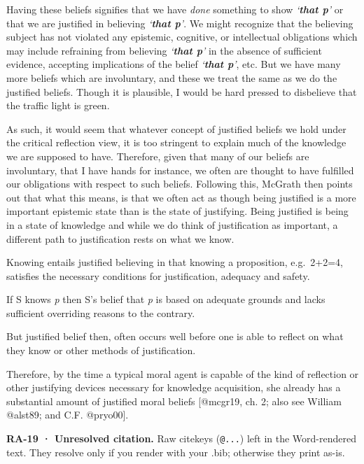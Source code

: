 \documentclass[
  letterpaper,
  DIV=11,
  numbers=noendperiod]{scrartcl}
\theoremstyle{remark}
\begin{document}
Having these beliefs signifies that we have \emph{done} something to
show \emph{`\textbf{that p}'} or that we are justified in believing
\emph{`\textbf{that p}'}. We might recognize that the believing subject
has not violated any epistemic, cognitive, or intellectual obligations
which may include refraining from believing \emph{`\textbf{that p}'} in
the absence of sufficient evidence, accepting implications of the belief
\emph{`\textbf{that p}'}, etc. But we have many more beliefs which are
involuntary, and these we treat the same as we do the justified beliefs.
Though it is plausible, I would be hard pressed to disbelieve that the
traffic light is green.

As such, it would seem that whatever concept of justified beliefs we
hold under the critical reflection view, it is too stringent to explain
much of the knowledge we are supposed to have. Therefore, given that
many of our beliefs are involuntary, that I have hands for instance, we
often are thought to have fulfilled our obligations with respect to such
beliefs. Following this, McGrath then points out that what this means,
is that we often act as though being justified is a more important
epistemic state than is the state of justifying. Being justified is
being in a state of knowledge and while we do think of justification as
important, a different path to justification rests on what we know.

Knowing entails justified believing in that knowing a proposition,
e.g.~2+2=4, satisfies the necessary conditions for justification,
adequacy and safety.

If S knows \emph{p} then S's belief that \emph{p} is based on adequate
grounds and lacks sufficient overriding reasons to the contrary.

But justified belief then, often occurs well before one is able to
reflect on what they know or other methods of justification.

Therefore, by the time a typical moral agent is capable of the kind of
reflection or other justifying devices necessary for knowledge
acquisition, she already has a substantial amount of justified moral
beliefs {[}@mcgr19, ch. 2; also see William @alst89; and C.F.
@pryo00{]}.

\begin{tcolorbox}[enhanced jigsaw, arc=.35mm, bottomrule=.15mm, bottomtitle=1mm, breakable, colback=white, colbacktitle=quarto-callout-warning-color!10!white, colframe=quarto-callout-warning-color-frame, coltitle=black, left=2mm, leftrule=.75mm, opacityback=0, opacitybacktitle=0.6, rightrule=.15mm, title=\textcolor{quarto-callout-warning-color}{\faExclamationTriangle}\hspace{0.5em}{Warning}, titlerule=0mm, toprule=.15mm, toptitle=1mm]

\textbf{RA-19 · Unresolved citation.} Raw citekeys (\texttt{@...}) left
in the Word-rendered text. They resolve only if you render with your
.bib; otherwise they print as-is.

\end{tcolorbox}
\end{document}
